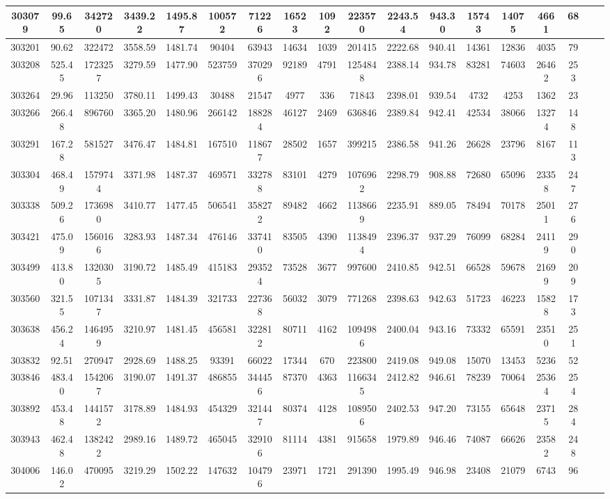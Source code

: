 \documentclass[10pt]{extarticle}
\begin{document}
\begin{longtable}{|c|c|c|c|c|c|c|c|c|c|c|c|c|c|c|c|c|c|}
\hline 
303079&99.65&342720&3439.22&1495.87&100572&71226&16523&1092&223570&2243.54&943.30&15743&14075&4661&68 \\ 
\hline 
303201&90.62&322472&3558.59&1481.74&90404&63943&14634&1039&201415&2222.68&940.41&14361&12836&4035&79 \\ 
\hline 
303208&525.45&1723257&3279.59&1477.90&523759&370296&92189&4791&1254848&2388.14&934.78&83281&74603&26462&253 \\ 
\hline 
303264&29.96&113250&3780.11&1499.43&30488&21547&4977&336&71843&2398.01&939.54&4732&4253&1362&23 \\ 
\hline 
303266&266.48&896760&3365.20&1480.96&266142&188284&46127&2469&636846&2389.84&942.41&42534&38066&13274&148 \\ 
\hline 
303291&167.28&581527&3476.47&1484.81&167510&118677&28502&1657&399215&2386.58&941.26&26628&23796&8167&113 \\ 
\hline 
303304&468.49&1579744&3371.98&1487.37&469571&332788&83101&4279&1076962&2298.79&908.88&72680&65096&23358&247 \\ 
\hline 
303338&509.26&1736980&3410.77&1477.45&506541&358272&89482&4662&1138669&2235.91&889.05&78494&70178&25011&276 \\ 
\hline 
303421&475.09&1560166&3283.93&1487.34&476146&337410&83505&4390&1138494&2396.37&937.29&76099&68284&24119&290 \\ 
\hline 
303499&413.80&1320305&3190.72&1485.49&415183&293524&73528&3677&997600&2410.85&942.51&66528&59678&21699&209 \\ 
\hline 
303560&321.55&1071347&3331.87&1484.39&321733&227368&56032&3079&771268&2398.63&942.63&51723&46223&15828&173 \\ 
\hline 
303638&456.24&1464959&3210.97&1481.45&456581&322812&80711&4162&1094986&2400.04&943.16&73332&65591&23510&251 \\ 
\hline 
303832&92.51&270947&2928.69&1488.25&93391&66022&17344&670&223800&2419.08&949.08&15070&13453&5236&52 \\ 
\hline 
303846&483.40&1542067&3190.07&1491.37&486855&344456&87370&4363&1166345&2412.82&946.61&78239&70064&25364&254 \\ 
\hline 
303892&453.48&1441572&3178.89&1484.93&454329&321447&80374&4128&1089506&2402.53&947.20&73155&65648&23715&284 \\ 
\hline 
303943&462.48&1382422&2989.16&1489.72&465045&329106&81114&4381&915658&1979.89&946.46&74087&66626&23582&248 \\ 
\hline 
304006&146.02&470095&3219.29&1502.22&147632&104796&23971&1721&291390&1995.49&946.98&23408&21079&6743&96 \\ 

\end{longtable}
\end{document}

